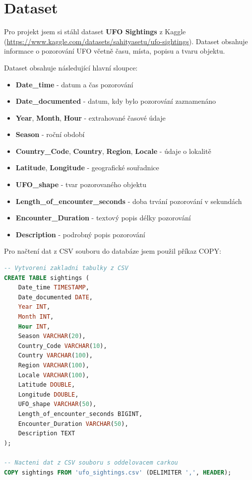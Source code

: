 \documentclass[a4paper,12pt]{article}
\begin{document}
\section{Dataset}
Pro projekt jsem si stáhl dataset \textbf{UFO Sightings} z Kaggle (\url{https://www.kaggle.com/datasets/sahityasetu/ufo-sightings}). Dataset obsahuje informace o pozorování UFO včetně času, místa, popisu a tvaru objektu.

Dataset obsahuje následující hlavní sloupce:
\begin{itemize}
    \item \textbf{Date\_time} - datum a čas pozorování
    \item \textbf{Date\_documented} - datum, kdy bylo pozorování zaznamenáno
    \item \textbf{Year}, \textbf{Month}, \textbf{Hour} - extrahované časové údaje
    \item \textbf{Season} - roční období
    \item \textbf{Country\_Code}, \textbf{Country}, \textbf{Region}, \textbf{Locale} - údaje o lokalitě
    \item \textbf{Latitude}, \textbf{Longitude} - geografické souřadnice
    \item \textbf{UFO\_shape} - tvar pozorovaného objektu
    \item \textbf{Length\_of\_encounter\_seconds} - doba trvání pozorování v sekundách 
    \item \textbf{Encounter\_Duration} - textový popis délky pozorování
    \item \textbf{Description} - podrobný popis pozorování
\end{itemize}

Pro načtení dat z CSV souboru do databáze jsem použil příkaz COPY:

\begin{lstlisting}[language=sql, caption=Načtení dat z CSV souboru]
-- Vytvoreni zakladni tabulky z CSV
CREATE TABLE sightings (
    Date_time TIMESTAMP,
    Date_documented DATE,
    Year INT,
    Month INT,
    Hour INT,
    Season VARCHAR(20),
    Country_Code VARCHAR(10),
    Country VARCHAR(100),
    Region VARCHAR(100),
    Locale VARCHAR(100),
    Latitude DOUBLE,
    Longitude DOUBLE,
    UFO_shape VARCHAR(50),
    Length_of_encounter_seconds BIGINT,
    Encounter_Duration VARCHAR(50),
    Description TEXT
);

-- Nacteni dat z CSV souboru s oddelovacem carkou
COPY sightings FROM 'ufo_sightings.csv' (DELIMITER ',', HEADER);
\end{lstlisting}
\end{document}
